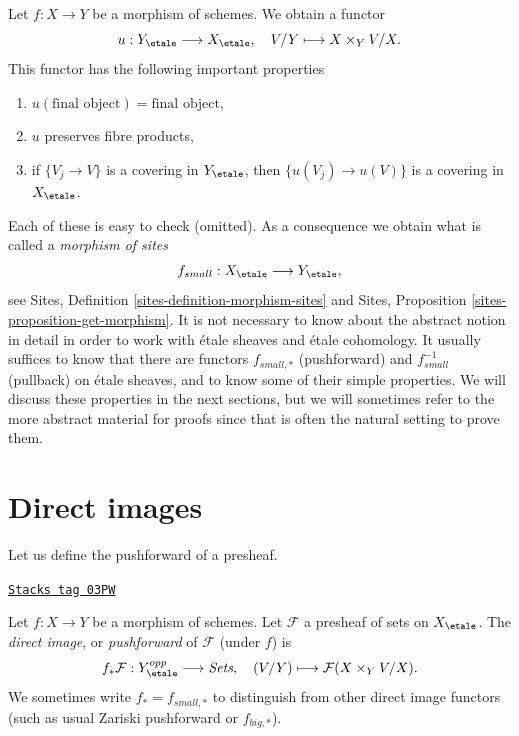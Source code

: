 \medskip\noindent
Let $f : X \to Y$ be a morphism of schemes. We obtain a functor
\begin{equation}
\label{equation-functorial}
u : Y_\etale \longrightarrow X_\etale, \quad
V/Y \longmapsto X \times_Y V/X.
\end{equation}
This functor has the following important properties
\begin{enumerate}
\item $u(\text{final object}) = \text{final object}$,
\item $u$ preserves fibre products,
\item if $\{V_j \to V\}$ is a covering in $Y_\etale$, then
$\{u(V_j) \to u(V)\}$ is a covering in $X_\etale$.
\end{enumerate}
Each of these is easy to check (omitted). As a consequence we obtain what
is called a {\it morphism of sites}
$$
f_{small} : X_\etale \longrightarrow Y_\etale,
$$
see
Sites, Definition \ref{sites-definition-morphism-sites}
and
Sites, Proposition \ref{sites-proposition-get-morphism}.
It is not necessary to know about the abstract notion in detail
in order to work with \'etale sheaves and \'etale cohomology.
It usually suffices to know that there are functors
$f_{small, *}$ (pushforward) and $f_{small}^{-1}$ (pullback)
on \'etale sheaves, and to know some of their simple properties.
We will discuss these properties in the next sections, but we will
sometimes refer to the more abstract material for proofs since
that is often the natural setting to prove them.

\section{Direct images}
\label{etale-cohomology-section-direct-image}
Let us define the pushforward of a presheaf.

\begin{definition}
\label{etale-cohomology-definition-direct-image-presheaf}
\href{https://stacks.math.columbia.edu/tag/03PW}{\texttt{Stacks tag 03PW}}

Let $f: X\to Y$ be a morphism of schemes.
Let $\mathcal{F} $ a presheaf of sets on $X_\etale$.
The {\it direct image}, or {\it pushforward} of $\mathcal{F}$
(under $f$) is
$$
f_*\mathcal{F} : Y_\etale^{opp} \longrightarrow \textit{Sets}, \quad
(V/Y) \longmapsto \mathcal{F}(X \times_Y V/X).
$$
We sometimes write $f_* = f_{small, *}$ to distinguish from other
direct image functors (such as usual Zariski pushforward or $f_{big, *}$).
\end{definition}

